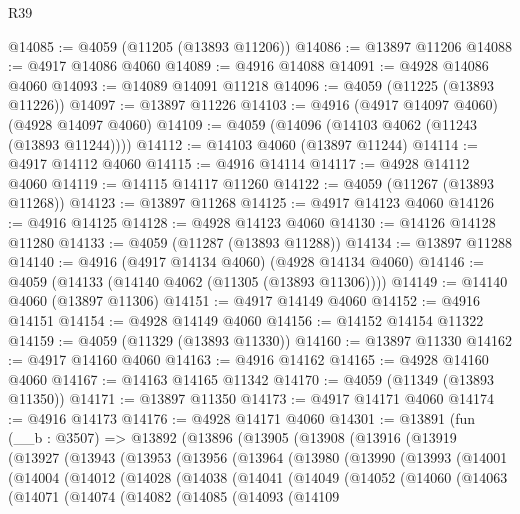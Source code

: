 \begin{lexlean}{R39}
\begin{coremodule}
@14085 := @4059 (@11205 (@13893 @11206))
@14086 := @13897 @11206
@14088 := @4917 @14086 @4060
@14089 := @4916 @14088
@14091 := @4928 @14086 @4060
@14093 := @14089 @14091 @11218
@14096 := @4059 (@11225 (@13893 @11226))
@14097 := @13897 @11226
@14103 := @4916 (@4917 @14097 @4060) (@4928 @14097 @4060)
@14109 := @4059 (@14096 (@14103 @4062 (@11243 (@13893 @11244))))
@14112 := @14103 @4060 (@13897 @11244)
@14114 := @4917 @14112 @4060
@14115 := @4916 @14114
@14117 := @4928 @14112 @4060
@14119 := @14115 @14117 @11260
@14122 := @4059 (@11267 (@13893 @11268))
@14123 := @13897 @11268
@14125 := @4917 @14123 @4060
@14126 := @4916 @14125
@14128 := @4928 @14123 @4060
@14130 := @14126 @14128 @11280
@14133 := @4059 (@11287 (@13893 @11288))
@14134 := @13897 @11288
@14140 := @4916 (@4917 @14134 @4060) (@4928 @14134 @4060)
@14146 := @4059 (@14133 (@14140 @4062 (@11305 (@13893 @11306))))
@14149 := @14140 @4060 (@13897 @11306)
@14151 := @4917 @14149 @4060
@14152 := @4916 @14151
@14154 := @4928 @14149 @4060
@14156 := @14152 @14154 @11322
@14159 := @4059 (@11329 (@13893 @11330))
@14160 := @13897 @11330
@14162 := @4917 @14160 @4060
@14163 := @4916 @14162
@14165 := @4928 @14160 @4060
@14167 := @14163 @14165 @11342
@14170 := @4059 (@11349 (@13893 @11350))
@14171 := @13897 @11350
@14173 := @4917 @14171 @4060
@14174 := @4916 @14173
@14176 := @4928 @14171 @4060
@14301 := @13891
    (fun (__b : @3507) =>
    @13892
      (@13896
        (@13905
          (@13908
            (@13916
              (@13919
                (@13927
                  (@13943
                    (@13953
                      (@13956
                        (@13964
                          (@13980
                            (@13990
                              (@13993
                                (@14001
                                  (@14004
                                    (@14012
                                      (@14028
                                        (@14038
                                          (@14041
                                            (@14049
                                              (@14052
                                                (@14060
                                                  (@14063
                                                    (@14071
                                                      (@14074
                                                        (@14082
                                                          (@14085
                                                            (@14093
                                                              (@14109

\end{coremodule}
\end{lexlean}
